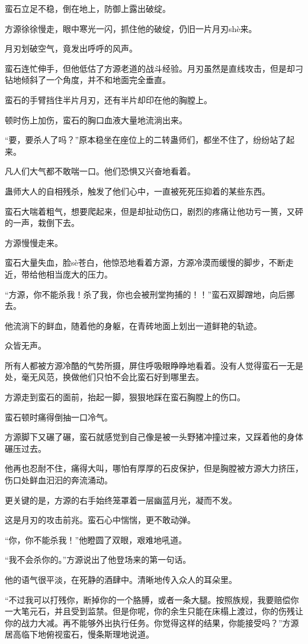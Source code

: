 \begin{this_body}
蛮石立足不稳，倒在地上，防御上露出破绽。

方源徐徐慢走，眼中寒光一闪，抓住他的破绽，仍旧一片月刃shè来。

月刃划破空气，竟发出呼呼的风声。

蛮石连忙伸手，但他低估了方源老道的战斗经验。月刃虽然是直线攻击，但是却刁钻地倾斜了一个角度，并不和地面完全垂直。

蛮石的手臂挡住半片月刃，还有半片却印在他的胸膛上。

顿时伤上加伤，蛮石的胸口血液大量地流淌出来。

“要，要杀人了吗？”原本稳坐在座位上的二转蛊师们，都坐不住了，纷纷站了起来。

凡人们大气都不敢喘一口。他们恐惧又兴奋地看着。

蛊师大人的自相残杀，触发了他们心中，一直被死死压抑着的某些东西。

蛮石大喘着粗气，想要爬起来，但是却扯动伤口，剧烈的疼痛让他功亏一篑，又砰的一声，栽倒下去。

方源慢慢走来。

蛮石大量失血，脸sè苍白，他惊恐地看着方源，方源冷漠而缓慢的脚步，不断走近，带给他相当庞大的压力。

“方源，你不能杀我！杀了我，你也会被刑堂拘捕的！！”蛮石双脚蹭地，向后挪去。

他流淌下的鲜血，随着他的身躯，在青砖地面上划出一道鲜艳的轨迹。

众皆无声。

所有人都被方源冷酷的气势所摄，屏住呼吸眼睁睁地看着。没有人觉得蛮石一无是处，毫无风范，换做他们只怕不会比蛮石好到哪里去。

方源走到蛮石的面前，抬起一脚，狠狠地踩在蛮石胸膛上的伤口。

蛮石顿时痛得倒抽一口冷气。

方源脚下又碾了碾，蛮石就感觉到自己像是被一头野猪冲撞过来，又踩着他的身体碾压过去。

他再也忍耐不住，痛得大叫，哪怕有厚厚的石皮保护，但是胸膛被方源大力挤压，伤口处鲜血汩汩的奔流涌动。

更关键的是，方源的右手始终笼罩着一层幽蓝月光，凝而不发。

这是月刃的攻击前兆。蛮石心中惴惴，更不敢动弹。

“你，你不能杀我！”他瞪圆了双眼，艰难地吼道。

“我不会杀你的。”方源说出了他登场来的第一句话。

他的语气很平淡，在死静的酒肆中。清晰地传入众人的耳朵里。

“不过我可以打残你，断掉你的一个胳膊，或者一条大腿。按照族规，我要赔偿你一大笔元石，并且受到监禁。但是你呢，你的余生只能在床榻上渡过，你的伤残让你的战力大减。再不能够外出执行任务。你觉得这样的结果，你能接受吗？”方源居高临下地俯视蛮石，慢条斯理地说道。


\end{this_body}

